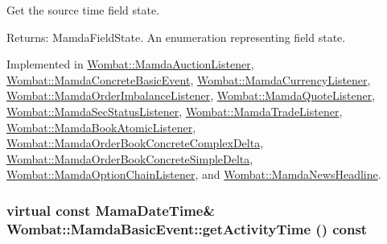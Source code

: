 Get the source time field state. 

\begin{Desc}
\item[Returns:]Mamda\-Field\-State. An enumeration representing field state. \end{Desc}


Implemented in \hyperlink{classWombat_1_1MamdaAuctionListener_147fd8bbd8cdd66a644d84146e9fda34}{Wombat::Mamda\-Auction\-Listener}, \hyperlink{classWombat_1_1MamdaConcreteBasicEvent_cf84914b1c21f84fc7488a2b385816a6}{Wombat::Mamda\-Concrete\-Basic\-Event}, \hyperlink{classWombat_1_1MamdaCurrencyListener_8a309624a9e76fb5e943560e17dd7bf8}{Wombat::Mamda\-Currency\-Listener}, \hyperlink{classWombat_1_1MamdaOrderImbalanceListener_6f070f42d8d7bf1b6260014835020c11}{Wombat::Mamda\-Order\-Imbalance\-Listener}, \hyperlink{classWombat_1_1MamdaQuoteListener_50550dbdc63d6a518052710d8414387c}{Wombat::Mamda\-Quote\-Listener}, \hyperlink{classWombat_1_1MamdaSecStatusListener_6d515670385459d9ac8165a9edc9f364}{Wombat::Mamda\-Sec\-Status\-Listener}, \hyperlink{classWombat_1_1MamdaTradeListener_a228f95b1fd47f62b1d57e88c6b6482a}{Wombat::Mamda\-Trade\-Listener}, \hyperlink{classWombat_1_1MamdaBookAtomicListener_22cb444aedd516da0ea66a2a6ca85d39}{Wombat::Mamda\-Book\-Atomic\-Listener}, \hyperlink{classWombat_1_1MamdaOrderBookConcreteComplexDelta_673314cd0d612a82444d9dee126024b4}{Wombat::Mamda\-Order\-Book\-Concrete\-Complex\-Delta}, \hyperlink{classWombat_1_1MamdaOrderBookConcreteSimpleDelta_f5679fbd65c7406cc4e6b905460a5159}{Wombat::Mamda\-Order\-Book\-Concrete\-Simple\-Delta}, \hyperlink{classWombat_1_1MamdaOptionChainListener_7f2c10954ad153ad4b6e051705fd60fe}{Wombat::Mamda\-Option\-Chain\-Listener}, and \hyperlink{classWombat_1_1MamdaNewsHeadline_dcc694fb0275a765150b900a12e0eb83}{Wombat::Mamda\-News\-Headline}.\hypertarget{classWombat_1_1MamdaBasicEvent_b3810afc69474ef3b192ee4c9307e714}{
\subsubsection[getActivityTime]{\setlength{\rightskip}{0pt plus 5cm}virtual const Mama\-Date\-Time\& Wombat::Mamda\-Basic\-Event::get\-Activity\-Time () const}}
\label{classWombat_1_1MamdaBasicEvent_b3810afc69474ef3b192ee4c9307e714}


